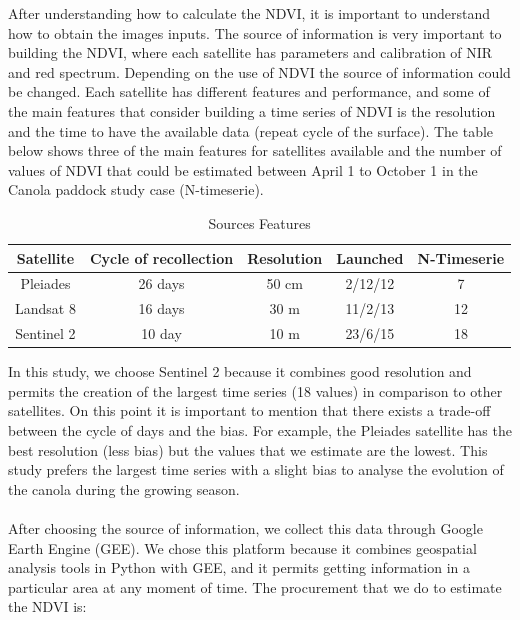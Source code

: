 \documentclass[fleqn,10pt]{wlscirep}
\begin{document}
After understanding how to calculate the NDVI, it is important to understand how to obtain the images inputs. The source of information is very important to building the NDVI, where each satellite has parameters and calibration of NIR and red spectrum. Depending on the use of NDVI the source of information could be changed. Each satellite has different features and performance, and some of the main features that consider building a time series of NDVI is the resolution and the time to have the available data (repeat cycle of the surface). The table below shows three of the main features for satellites available and the number of values of NDVI that could be estimated between April 1 to October 1 in the Canola paddock study case (N-timeserie).  
\begin{table}[]
\centering
\begin{tabular}{ccccc}
\hline
\textbf{Satellite} & \textbf{Cycle of recollection} & \textbf{Resolution} & \textbf{Launched} & \textbf{N-Timeserie} \\
\hline
Pleiades           & 26 days                        & 50 cm                & 2/12/12           & 7                    \\
Landsat 8          & 16 days                        & 30 m                & 11/2/13           & 12                   \\
Sentinel 2         & 10 day                         & 10 m                & 23/6/15           & 18                  
\\ 
\hline
\end{tabular}
\caption{Sources Features} 
\label{table:ventanasminutos}
\end{table}
In this study, we choose Sentinel 2 because it combines good resolution and permits the creation of the largest time series (18 values) in comparison to other satellites. On this point it is important to mention that there exists a trade-off between the cycle of days and the bias. For example, the Pleiades satellite has the best resolution (less bias) but the values that we estimate are the lowest. This study prefers the largest time series with a slight bias to analyse the evolution of the canola during the growing season.
\\~\\ 
After choosing the source of information, we collect this data through Google Earth Engine (GEE). We chose this platform because it combines geospatial analysis tools in Python with GEE, and it permits getting information in a particular area at any moment of time.  The procurement that we do to estimate the NDVI is: 
\end{document}
